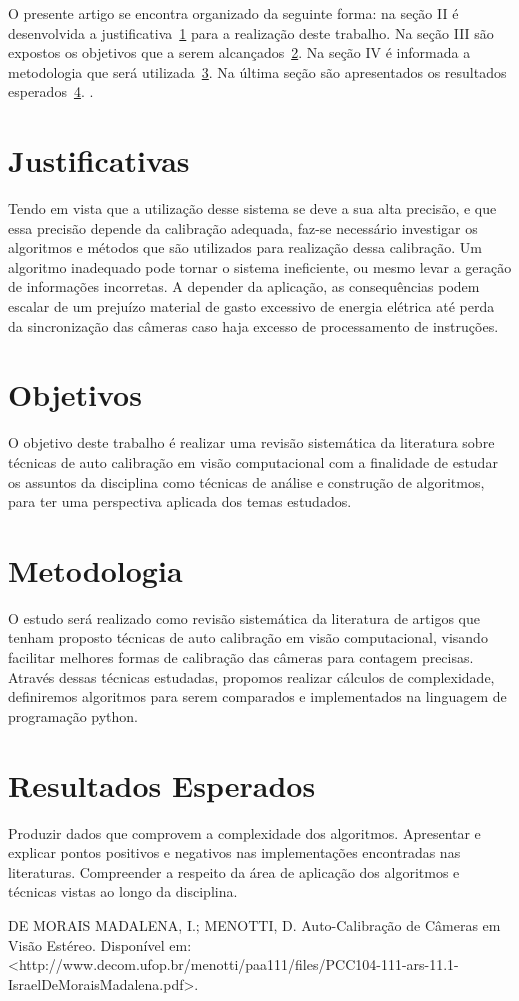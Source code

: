 \documentclass[portuguese]{sbrt}
\begin{document}
O presente artigo se encontra organizado da seguinte forma: na seção II é desenvolvida a justificativa~\ref{sec:justificativa} para a realização deste trabalho. Na seção III são expostos os objetivos que a serem alcançados~\ref{sec:objetivos}. Na seção IV é informada a metodologia que será utilizada~\ref{sec:metodologia}. Na última seção são apresentados os resultados esperados~\ref{sec:resultados_esperados}.
. 
\section{Justificativas}
\label{sec:justificativa}
  
Tendo em vista que a utilização desse sistema se deve a sua alta precisão, e que essa precisão depende da calibração adequada, faz-se necessário investigar os algoritmos e métodos que são utilizados para realização dessa calibração. 
Um algoritmo inadequado pode tornar o sistema ineficiente, ou mesmo levar a geração de informações incorretas. A depender da aplicação, as consequências podem escalar de um prejuízo material de gasto excessivo de energia elétrica até perda da sincronização das câmeras caso haja excesso de processamento de instruções.

  
\section{Objetivos}
\label{sec:objetivos}
  
O objetivo deste trabalho é realizar uma revisão sistemática da literatura sobre técnicas de auto calibração em visão computacional com a finalidade de estudar os assuntos da disciplina como técnicas de análise e construção de algoritmos, para ter uma perspectiva aplicada dos temas estudados. 


\section{Metodologia} 
\label{sec:metodologia}

O estudo será realizado como revisão sistemática da literatura de artigos que tenham proposto técnicas de auto calibração em visão computacional, visando facilitar melhores formas de calibração das câmeras para contagem precisas. Através dessas técnicas estudadas, propomos realizar cálculos de complexidade, definiremos algoritmos para serem comparados e implementados na linguagem de programação python.

\section{Resultados Esperados}
\label{sec:resultados_esperados}
Produzir dados que comprovem a complexidade dos algoritmos. Apresentar e explicar pontos positivos e negativos nas implementações encontradas nas literaturas. Compreender a respeito da área de aplicação dos algoritmos e técnicas vistas ao longo da disciplina.
  
 

DE MORAIS MADALENA, I.; MENOTTI, D. Auto-Calibração de Câmeras em Visão Estéreo. Disponível em: <http://www.decom.ufop.br/menotti/paa111/files/PCC104-111-ars-11.1-IsraelDeMoraisMadalena.pdf>.
\end{document}
